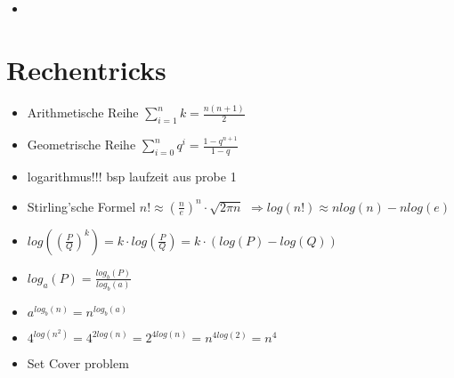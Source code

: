\documentclass{article}
\begin{document}
\subsection{}
\begin{itemize}
\item
\end{itemize}



\section{Rechentricks}
\begin{itemize}
\item Arithmetische Reihe $\sum_{i=1}^n k  = \frac{n(n+1)}{2} $
\item Geometrische Reihe $\sum_{i=0}^n q^i = \frac{1-q^{n+1}}{1-q}$
\item logarithmus!!! bsp laufzeit aus probe 1
\item Stirling'sche Formel $n! \approx (\frac{n}{e})^n \cdot \sqrt{2\pi n}$ \newline
$ \Rightarrow  log(n!) \approx nlog(n)-nlog(e)$
\item $log((\frac{P}{Q})^k) = k \cdot log(\frac{P}{Q}) = k \cdot (log(P) - log(Q)) $
\item $log_a(P) = \frac{log_b(P)}{log_b(a)}$
\item $a^{log_b(n)} = n^{log_b(a)}$
\item $4^{log(n^2)} = 4^{2log(n)} =2^{4log(n)} = n^{4log(2)} = n^4 $





\item Set Cover problem


\end{itemize}
\end{document}

